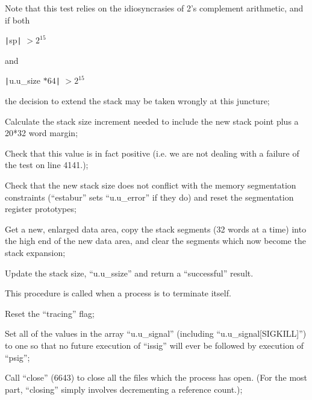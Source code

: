 Note that this test relies on the
idiosyncrasies of 2's complement
arithmetic, and if both

\begin{center}
\verb+|+sp\verb+|+ $> 2^{15}$
\end{center}

\noindent and

\begin{center}
\verb+|+u.u\_size $* 64$\verb+|+ $> 2^{15}$
\end{center}

\noindent the decision to extend the stack
may be taken wrongly at this
juncture;

\item[4143:] Calculate the stack size increment needed to include the new
 stack point plus a 20*32 word
 margin;


\item[4144:] Check that this value is in fact
 positive (i.e. we are not dealing
 with a failure of the test on
 line 4141.);

\item[4146:] Check that the new stack size
 does not conflict with the memory
 segmentation constraints (``estabur'' sets ``u.u\_error'' if they do)
 and reset the segmentation register prototypes;

\item[4148:] Get a new, enlarged data area,
 copy the stack segments (32 words
 at a time) into the high end of
 the new data area, and clear the
 segments which now become the
 stack expansion;

\item[4156:] Update the stack size,
 ``u.u\_ssize'' and return a ``successful'' result.
\ed



This procedure is called when a process
is to terminate itself.

\bd
\item[3224:] Reset the ``tracing'' flag;

\item[3225:] Set all of the values in the
 array ``u.u\_signal'' (including
 ``u.u\_signal[SIGKILL]'') to one so
 that no future execution of
 ``issig'' will ever be followed by
 execution of ``psig'';

\item[3227:] Call ``close'' (6643) to close all
 the files which the process has
 open. (For the most part, ``closing'' simply involves decrementing
 a reference count.);

